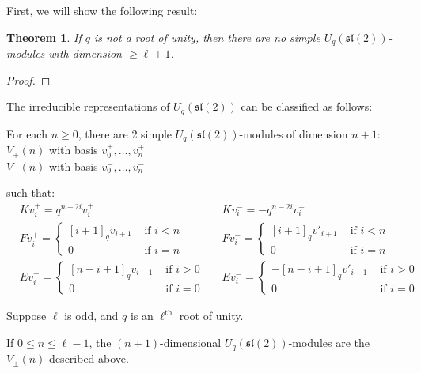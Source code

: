 \documentclass[]{article}
\newtheorem{theorem}{Theorem}[subsection]
\newcommand{\sll}{\mathfrak{sl}}
\numberwithin{equation}{subsection}
\begin{document}
First, we will show the following result:

\begin{theorem}
If $q$ is not a root of unity, then there are no simple $U_q(\sll(2))$-modules
with dimension $\geq \ell+1$. 
\end{theorem}

\begin{proof}
\end{proof}

The irreducible representations of
$U_q(\sll(2))$ can be classified as follows: 

For each $n\geq 0$, there are 2 simple $U_q(\sll(2))$-modules of dimension $n+1$: 
$V_+(n)$ with basis $v^+_0, \ldots, v^+_n$ \\
$V_-(n)$ with basis $v^-_0, \ldots, v^-_n$

such that: 
\begin{align*}
    &K v^+_i = q^{n-2i} v^+_i  &
    &K v^-_i = -q^{n-2i} v^-_i \\
    &F v^+_i = \begin{cases} [i+1]_qv_{i+1}& \text{ if $i < n$} \\ 0& \text{ if $i = n$} \end{cases} &
    &F v^-_i = \begin{cases} [i+1]_qv'_{i+1}& \text{ if $i < n$} \\ 0& \text{ if $i = n$} \end{cases} \\
    &E v^+_i = \begin{cases} 
                     [n-i+1]_qv_{i-1}& \text{ if $i > 0$} \\ 
                    0& \text{ if $i = 0$} 
             \end{cases} &
    &E v^-_i = \begin{cases} 
                    -[n-i+1]_q v'_{i-1}& \text{ if $i > 0$} \\ 
                    0& \text{ if $i = 0$} 
             \end{cases}
\end{align*}


Suppose $\ell$ is odd, and $q$ is an $\ell^{\text{th}}$ root of unity. 

If $0 \leq n \leq \ell - 1$, the $(n+1)$-dimensional
$U_q(\sll(2))$-modules are the $V_{\pm}(n)$ described above. 
\end{document}
